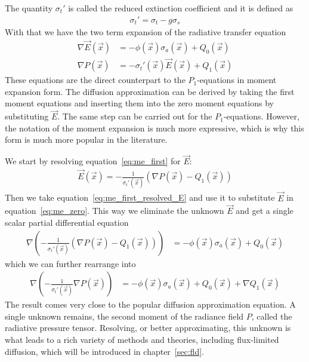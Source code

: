 The quantity $\sigma_t'$ is called the reduced extinction coefficient and it is defined as
\begin{align*}
\sigma_t' = \sigma_t - g\sigma_s
\end{align*}
With that we have the two term expansion of the radiative transfer equation
\begin{align}
\label{eq:me_zero}
\nabla\vec{E}\left(\vec{x}\right)&=
-\phi(\vec{x})\sigma_a(\vec{x})
+Q_0\left(\vec{x}\right)
\\
\label{eq:me_first}
\nabla P\left(\vec{x}\right) &= -\sigma_t'(\vec{x})\vec{E}\left(\vec{x}\right)
+Q_1\left(\vec{x}\right)
\end{align}
These equations are the direct counterpart to the $P_1$-equations in moment expansion form. The diffusion approximation can be derived by taking the first moment equations and inserting them into the zero moment equations by substituting $\vec{E}$. The same step can be carried out for the $P_1$-equations. However, the notation of the moment expansion is much more expressive, which is why this form is much more popular in the literature.

We start by resolving equation~\ref{eq:me_first} for $\vec{E}$:
\begin{align}
\label{eq:me_first_resolved_E}
\vec{E}\left(\vec{x}\right) =
-\frac{1}{\sigma_t'\left(\vec{x}\right)}
\left(
\nabla P\left(\vec{x}\right)
-Q_1\left(\vec{x}\right)
\right)
\end{align}
Then we take equation~\ref{eq:me_first_resolved_E} and use it to substitute $\vec{E}$ in equation~\ref{eq:me_zero}. This way we eliminate the unknown $\vec{E}$ and get a single scalar partial differential equation
\begin{align}
\nabla
\left(
-\frac{1}{\sigma_t'\left(\vec{x}\right)}
\left(
\nabla P\left(\vec{x}\right)
-Q_1\left(\vec{x}\right)
\right)
\right)&=
-\phi(\vec{x})\sigma_a(\vec{x})
+Q_0\left(\vec{x}\right)
\end{align}
which we can further rearrange into
\begin{align}
\label{eq:general_diffusion_equation}
\nabla
\left(
-\frac{1}{\sigma_t'\left(\vec{x}\right)}
\nabla P\left(\vec{x}\right)
\right)&=
-\phi(\vec{x})\sigma_a(\vec{x})
+Q_0\left(\vec{x}\right)
+\nabla Q_1\left(\vec{x}\right)
\end{align}
The result comes very close to the popular diffusion approximation equation. A single unknown remains, the second moment of the radiance field $P$, called the radiative pressure tensor. Resolving, or better approximating, this unknown is what leads to a rich variety of methods and theories, including flux-limited diffusion, which will be introduced in chapter~\ref{sec:fld}.





%

